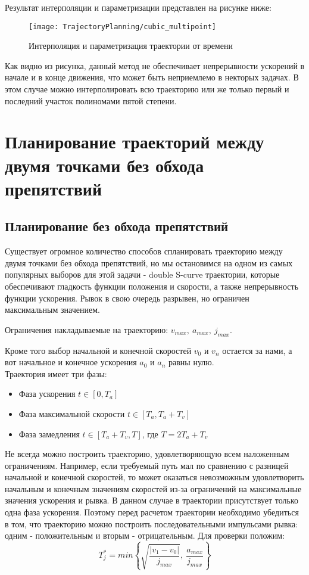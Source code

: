 Результат интерполяции и параметризации представлен на рисунке ниже:
\begin{figure}[ht]
	\centering
	\texttt{[image: TrajectoryPlanning/cubic\_multipoint]}
	\caption{Интерполяция и параметризация траектории от времени}
\end{figure}

Как видно из рисунка, данный метод не обеспечивает непрерывности ускорений в начале и в конце движения, что может быть неприемлемо в некторых задачах. В этом случае можно интерполировать всю траекторию или же только первый и последний участок полиномами пятой степени.


\section{Планирование траекторий между двумя точками без обхода препятствий} \label{sect2_3}

\subsection{Планирование без обхода препятствий} \label{subsect2_3_1}
	Существует огромное количество способов спланировать траекторию между двумя точками без обхода препятствий, но мы остановимся на одном из самых популярных выборов для этой задачи - double S-curve траектории, которые обеспечивают гладкость функции положения и скорости, а также непрерывность функции ускорения. Рывок в свою очередь разрывен, но ограничен максимальным значением.

	Ограничения накладываемые на траекторию: $v_{max},\ a_{max},\ j_{max}$.
	
	Кроме того выбор начальной и конечной скоростей $v_{0}$ и $v_{n}$ остается за нами, а вот начальное и конечное ускорения $a_{0}$ и $a_{n}$ равны нулю.\\
	
	Траектория имеет три фазы:
	\begin{itemize}
		\item Фаза ускорения $t \in [0,T_{a}]$
		\item Фаза максимальной скорости $t \in [T_{a}, T_{a} + T_{v}]$
		\item Фаза замедления $t \in [T_{a} + T_{v}, T]$, где $T = 2T_{a} + T_{v}$
	\end{itemize}

	Не всегда можно построить траекторию, удовлетворяющую всем наложенным ограничениям. Например, если требуемый путь мал по сравнению с разницей начальной и конечной скоростей, то может оказаться невозможным удовлетворить начальным и конечным значениям скоростей из-за ограничений на максимальные значения ускорения и рывка. В данном случае в траектории присутствует только одна фаза ускорения. Поэтому перед расчетом траектории необходимо убедиться в том, что траекторию можно построить последовательными импульсами рывка: одним - положительным и вторым - отрицательным. Для проверки положим:
	\[
	T_{j}^{*} = min \left\{ \sqrt{\frac{|v_{1} - v_{0}|}{j_{max}}},\ \frac{a_{max}}{j_{max}} \right\}
	\]
	
